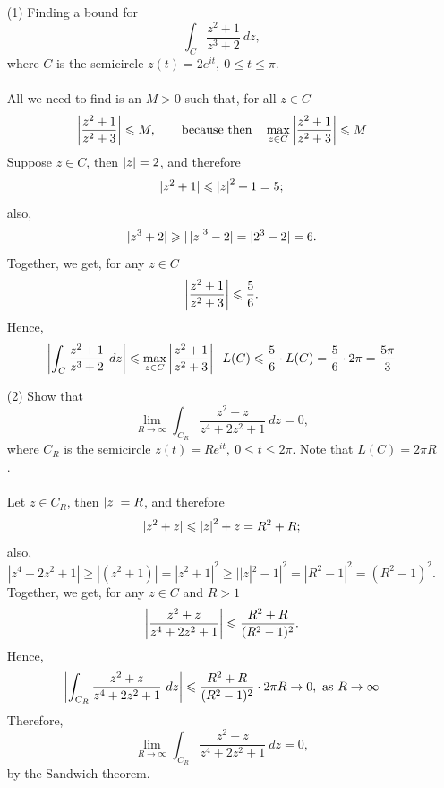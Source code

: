 \medskip

\begin{example}\hfill
\begin{itemize}
\item[(1)] Finding a bound for
\[\int_C\frac{z^2 + 1}{z^3 + 2}\ dz,\]
where $C$ is the semicircle $z(t) = 2e^{it},\ 0 \leq t \leq \pi$.\\
\\
All we need to find is an $M > 0$ such that, for all $z \in C$
\[\left\lvert\frac{z^2 + 1}{z^2 + 3}\right\rvert \leqslant M,\qquad \text{because then}\quad\max_{z \in C}\left\lvert\frac{z^2 + 1}{z^2 + 3}\right\rvert \leqslant M\]
Suppose $z \in C$, then $\left\lvert z\right\rvert = 2$, and therefore
\[|z^2 + 1| \leqslant \left\lvert z\right\rvert^2 + 1 = 5;\]
also,
\[|z^3 + 2| \geqslant |\left\lvert z\right\rvert^3 - 2| = |2^3 - 2| = 6.\]
Together, we get, for any $z \in C$
\[\left\lvert\frac{z^2 + 1}{z^2 + 3}\right\rvert \leqslant \frac{5}{6}.\]
Hence, 
\[\left\lvert\int_C\frac{z^2 + 1}{z^3 + 2}\ dz\right\rvert \leqslant \max_{z \in C}\left\lvert\frac{z^2 + 1}{z^2 + 3}\right\rvert\cdot L(C) \leqslant \frac{5}{6}\cdot L(C) = \frac{5}{6}\cdot 2\pi = \frac{5\pi}{3}\]

\item[(2)] Show that
\[\lim_{R \to \infty}\int_{C_R}\frac{z^2 + z}{z^4 + 2z^2 + 1}\ dz = 0,\]
where $C_R$ is the semicircle $z(t) = Re^{it},\ 0 \leq t \leq 2\pi$. Note that $L(C) = 2\pi R$.\\
\\
Let $z \in C_R$, then $\left\lvert z\right\rvert = R$, and therefore
\[|z^2 + z| \leqslant \left\lvert z\right\rvert^2 + z = R^2 + R;\]
also,
\[|z^4 + 2z^2 + 1| \geq |(z^2 + 1)| = |z^2 + 1|^2 \geq ||z|^2 - 1|^2 = |R^2 - 1|^2 = (R^2 - 1)^2.\]
Together, we get, for any $z \in C$ and $R > 1$
\[\left\lvert\frac{z^2 + z}{z^4 + 2z^2 + 1}\right\rvert \leqslant \frac{R^2 + R}{(R^2 - 1)^2}.\]
Hence, 
\[\abs{\int_{C_R}\frac{z^2 + z}{z^4 + 2z^2 + 1}\ dz} \leq \frac{R^2 + R}{(R^2 - 1)^2}\cdot 2\pi R  \to 0,\ \text{as } R \to \infty\]
Therefore,
\[\lim_{R \to \infty}\int_{C_R}\frac{z^2 + z}{z^4 + 2z^2 + 1}\ dz = 0,\]
by the Sandwich theorem.
\end{itemize}
\end{example}

\medskip

